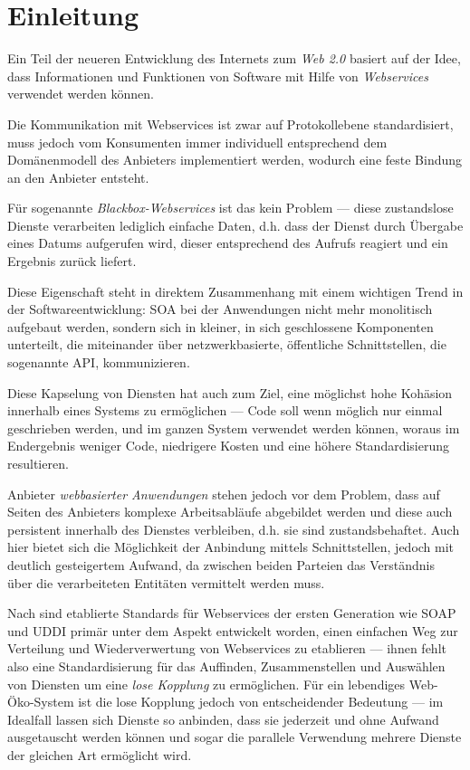 \section{Einleitung}
\label{l:einleitung}

Ein Teil der neueren Entwicklung des Internets zum \emph{Web 2.0} basiert auf der Idee, dass Informationen und Funktionen von Software mit Hilfe von \emph{Webservices} verwendet werden können.

Die Kommunikation mit Webservices ist zwar auf Protokollebene standardisiert, muss jedoch vom Konsumenten immer individuell entsprechend dem Domänenmodell des Anbieters implementiert werden, wodurch eine feste Bindung an den Anbieter entsteht. \cite{ka-cots}

Für sogenannte \emph{Blackbox-Webservices} ist das kein Problem --- diese zustandslose Dienste verarbeiten lediglich einfache Daten, d.h. dass der Dienst durch Übergabe eines Datums aufgerufen wird, dieser entsprechend des Aufrufs reagiert und ein Ergebnis zurück liefert.

Diese Eigenschaft steht in direktem Zusammenhang mit einem wichtigen Trend in der Softwareentwicklung: \ac{SOA} bei der Anwendungen nicht mehr monolitisch aufgebaut werden, sondern sich in kleiner, in sich geschlossene Komponenten unterteilt, die miteinander über netzwerkbasierte, öffentliche Schnittstellen, die sogenannte \ac{API}, kommunizieren.

Diese Kapselung von Diensten hat auch zum Ziel, eine möglichst hohe Kohäsion innerhalb eines Systems zu ermöglichen --- Code soll wenn möglich nur einmal geschrieben werden, und im ganzen System verwendet werden können, woraus im Endergebnis weniger Code, niedrigere Kosten und eine höhere Standardisierung resultieren. \cite{hn-web20}


Anbieter \emph{webbasierter Anwendungen} stehen jedoch vor dem Problem, dass auf Seiten des Anbieters komplexe Arbeitsabläufe abgebildet werden und diese auch persistent innerhalb des Dienstes verbleiben, d.h. sie sind zustandsbehaftet. Auch hier bietet sich die Möglichkeit der Anbindung mittels Schnittstellen, jedoch mit deutlich gesteigertem Aufwand, da zwischen beiden Parteien das Verständnis über die verarbeiteten 
Entitäten vermittelt werden muss. 

Nach \cite[Seite 653]{ei-sawsdl} sind etablierte Standards für Webservices der ersten Generation wie \ac{SOAP} und \ac{UDDI} primär unter dem Aspekt entwickelt worden, einen einfachen Weg zur Verteilung und Wiederverwertung von Webservices zu etablieren --- ihnen fehlt also eine Standardisierung für das Auffinden, Zusammenstellen und Auswählen von Diensten um eine \emph{lose Kopplung} zu ermöglichen. Für ein lebendiges Web-Öko-System ist die lose Kopplung jedoch von entscheidender Bedeutung --- im Idealfall lassen sich Dienste so anbinden, dass sie jederzeit und ohne Aufwand ausgetauscht werden können und sogar die parallele Verwendung mehrere Dienste der gleichen Art ermöglicht wird.  

